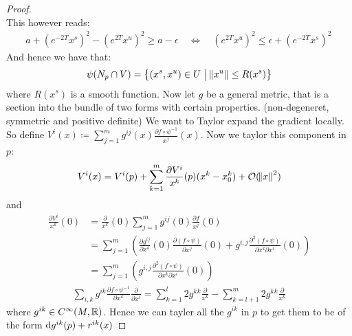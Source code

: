 \begin{proof}
\begin{equation}
\end{equation}
This however reads: 
\begin{align*}
     a+{( e^{-2T}x^s)}^2-(e^{2T}x^u)^2  \geq a-\epsilon  \quad \Leftrightarrow \quad (e^{2T}x^u)^2 \leq \epsilon+ {( e^{-2T}x^s)}^2 \, 
\end{align*}And hence we have that:
\begin{equation*}
    \psi(N_p\cap V)=\left\{(x^s,x^u)\in U ~\middle|~\norm{x^u}\leq R(x^s)\right\}
\end{equation*} where $R(x^s)$ is a smooth function. Now let $g$ be a general metric, that is a section into the bundle of two forms with certain properties. (non-degeneret, symmetric and positive definite) We want to Taylor expand the gradient locally. So define $V^i(x)\coloneq \sum_{j=1}^mg^{ij}(x)\frac{\partial f\circ \psi^{-1}}{x^j}(x)$. Now we taylor this component in $p$:
\begin{align*}
    V^i(x)=V^i(p)+\sum_{k=1}^m\frac{\partial V^i}{x^k}(p)(x^k-x^k_0)+\mathcal{O}(\norm{x}^2)
\end{align*} and 
\begin{align*}
    \frac{\partial V^i}{x^k}(0)
    & =    \frac{\partial}{x^k}(0)\sum_{j=1}^mg^{ij}(0)\frac{\partial f}{x^j}(0) \\
    &= \sum_{j=1}^m\left( \frac{\partial g^{ij}}{\partial x^k}(0) \frac{\partial (f\circ \psi)}{\partial x^j}(0)+g^{i,j}\frac{\partial^2 (f\circ \psi)}{\partial x^k \partial x^i}(0) \right) \\
    &= \sum_{j=1}^m\left( g^{i,j}\frac{\partial^2 (f\circ \psi)}{\partial x^k \partial x^i}(0) \right) 
\end{align*}
\begin{align*}
        \sum_{i,k} g^{ik}\frac{\partial f \circ \psi^{-1}}{\partial x^k} \frac{\partial}{\partial x^i}=\sum_{k=1}^l2g^{kk}\frac{\partial}{x^k}-\sum_{k=l+1}^m2g^{kk}\frac{\partial}{x^k}
\end{align*} where $g^{ik}\in C^{\infty}(M,\mathbb{R})$. Hence we can tayler all the $g^{ik}$ in $p$ to get them to be of the form $\mathop{}\!\mathrm{d} g^{ik}(p)+r^{ik}(x)$ 
\end{proof}
